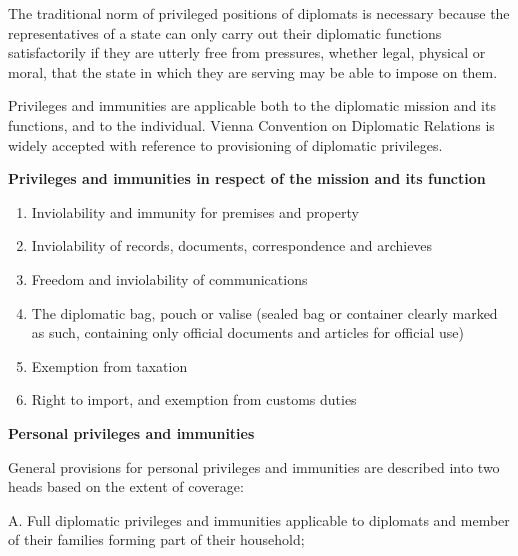 \documentclass[
  openany]{book}
\providecommand{\tightlist}{%
  \setlength{\itemsep}{0pt}\setlength{\parskip}{0pt}}
\begin{document}
The traditional norm of privileged positions of diplomats is necessary because the representatives of a state can only carry out their diplomatic functions satisfactorily if they are utterly free from pressures, whether legal, physical or moral, that the state in which they are serving may be able to impose on them.

Privileges and immunities are applicable both to the diplomatic mission and its functions, and to the individual. Vienna Convention on Diplomatic Relations is widely accepted with reference to provisioning of diplomatic privileges.

\textbf{Privileges and immunities in respect of the mission and its function}

\begin{enumerate}
\def\labelenumi{\arabic{enumi}.}
\tightlist
\item
  Inviolability and immunity for premises and property
\item
  Inviolability of records, documents, correspondence and archieves
\item
  Freedom and inviolability of communications
\item
  The diplomatic bag, pouch or valise (sealed bag or container clearly marked as such, containing only official documents and articles for official use)
\item
  Exemption from taxation
\item
  Right to import, and exemption from customs duties
\end{enumerate}

\textbf{Personal privileges and immunities}

General provisions for personal privileges and immunities are described into two heads based on the extent of coverage:

A. Full diplomatic privileges and immunities applicable to diplomats and member of their families forming part of their household;
\end{document}

